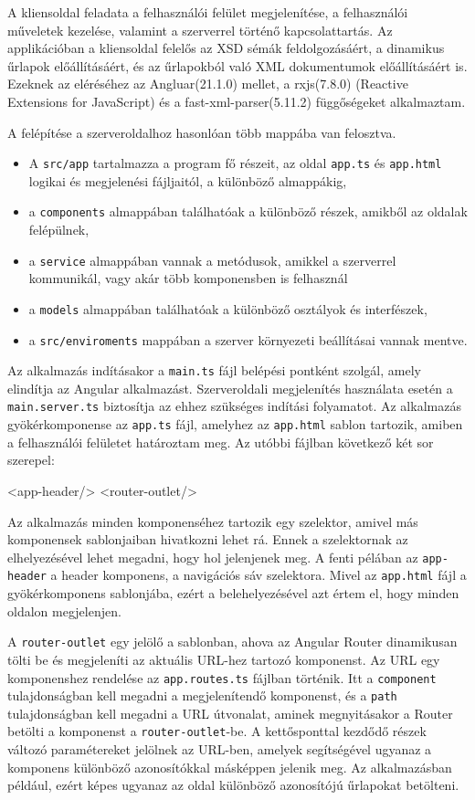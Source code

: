 A kliensoldal feladata a felhasználói felület megjelenítése, a felhasználói műveletek kezelése, valamint a szerverrel történő kapcsolattartás. Az applikációban a kliensoldal felelős az XSD sémák feldolgozásáért, a dinamikus űrlapok előállításáért, és az űrlapokból való XML dokumentumok előállításáért is. Ezeknek az eléréséhez az Angluar(21.1.0) mellet, a rxjs(7.8.0) (Reactive Extensions for JavaScript) és a fast-xml-parser(5.11.2) függőségeket alkalmaztam.

A felépítése a szerveroldalhoz hasonlóan több mappába van felosztva.
\begin{itemize}
\item A \texttt{src/app} tartalmazza a program fő részeit, az oldal \texttt{app.ts} és \texttt{app.html} logikai és megjelenési fájljaitól, a különböző almappákig,
\item a \texttt{components} almappában találhatóak a különböző részek, amikből az oldalak felépülnek,
\item a \texttt{service} almappában vannak a metódusok, amikkel a szerverrel kommunikál, vagy akár több komponensben is felhasznál
\item a \texttt{models} almappában találhatóak a különböző osztályok és interfészek,
\item a \texttt{src/enviroments} mappában a szerver környezeti beállításai vannak mentve.
\end{itemize}

Az alkalmazás indításakor a \texttt{main.ts} fájl belépési pontként szolgál, amely elindítja az Angular alkalmazást. Szerveroldali megjelenítés használata esetén a \texttt{main.server.ts} biztosítja az ehhez szükséges indítási folyamatot. Az alkalmazás gyökérkomponense az \texttt{app.ts} fájl, amelyhez az \texttt{app.html} sablon tartozik, amiben a felhasználói felületet határoztam meg. Az utóbbi fájlban következő két sor szerepel:
\begin{java}
<app-header/>
<router-outlet/>
\end{java}

Az alkalmazás minden komponenséhez tartozik egy szelektor, amivel más komponensek sablonjaiban hivatkozni lehet rá. Ennek a szelektornak az elhelyezésével lehet megadni, hogy hol jelenjenek meg. A fenti pélában az \texttt{app-header} a header komponens, a navigációs sáv szelektora. Mivel az \texttt{app.html} fájl a gyökérkomponens sablonjába, ezért a belehelyezésével azt értem el, hogy minden oldalon megjelenjen.

A \texttt{router-outlet} egy jelölő a sablonban, ahova az Angular Router dinamikusan tölti be és megjeleníti az aktuális URL-hez tartozó komponenst. Az URL egy komponenshez rendelése az \texttt{app.routes.ts} fájlban történik. Itt a \texttt{component} tulajdonságban kell megadni a megjelenítendő komponenst, és a \texttt{path} tulajdonságban kell megadni a URL útvonalat, aminek megnyitásakor a Router betölti a komponenst a \texttt{router-outlet}-be. A kettősponttal kezdődő részek változó paramétereket jelölnek az URL-ben, amelyek segítségével ugyanaz a komponens különböző azonosítókkal másképpen jelenik meg. Az alkalmazásban például, ezért képes ugyanaz az oldal különböző azonosítójú űrlapokat betölteni.

